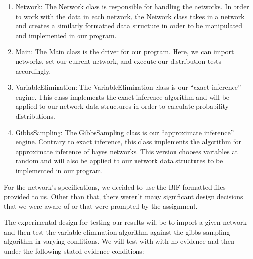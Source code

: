 \documentclass{article}
\begin{document}
\begin{enumerate}
    \item Network: The Network class is responsible for handling the 
    networks. In order to work with the data in each network, 
    the Network class takes in a network and creates a similarly 
    formatted data structure in order to be manipulated and 
    implemented in our program.
    \item Main: The Main class is the driver for our program. 
    Here, we can import networks, set our current network, and 
    execute our distribution tests accordingly. 
    \item VariableElimination: The VariableElimination class is 
    our “exact inference” engine. This class implements the exact 
    inference algorithm and will be applied to our network data 
    structures in order to calculate probability distributions.
    \item GibbsSampling: The GibbsSampling class is our “approximate 
    inference” engine. Contrary to exact inference, this class implements 
    the algorithm for approximate inference of bayes networks. This version 
    chooses variables at random and will also be applied to our network data 
    structures to be implemented in our program.
\end{enumerate}




For the network's specifications, we decided 
to use the BIF formatted files provided to us. Other than that, 
there weren’t many significant design decisions that we were aware of or that were prompted by the assignment. 




The experimental design for testing our results will be to import a given network and then test the variable elimination algorithm against the gibbs sampling algorithm in varying conditions. We will test with with no evidence and then under the following stated evidence conditions: 
\end{document}
